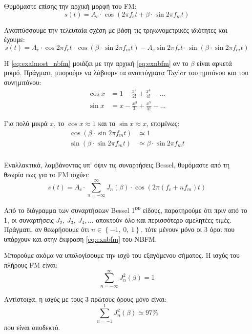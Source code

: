 \documentclass[11pt,a4paper,notitlepage,fleqn]{article}
\begin{document}
Θυμόμαστε επίσης την αρχική μορφή του FM:
\[
s(t) = A_c \cdot \cos\left(2πf_c t + β\cdot \sin 2πf_m t\right)
\]

Αναπτύσσουμε την τελευταία σχέση με βάση τις τριγωνομετρικές ιδιότητες και έχουμε:
\begin{equation}
	s(t) = A_c \cdot \cos 2πf_c t \cdot \cos \left(
	β\cdot \sin2π f_m t
	\right) - A_c \sin 2πf_c t \cdot \sin(β\cdot \sin 2πf_m t)
	\label{eq:exalmost_nbfm}
\end{equation}

Η \eqref{eq:exalmost_nbfm} μοιάζει με την αρχική \eqref{eq:exnbfm} αν το \( β \) είναι
αρκετά μικρό. Πράγματι, μπορούμε να λάβουμε τα αναπτύγματα Taylor του ημιτόνου και του
συνημιτόνου:
\begin{align*}
	\cos x &= 1 - \frac{x^2}{2!} + \frac{x^4}{4!} - \dots \\
	\sin x &= x - \frac{x^3}{3!} + \frac{x^5}{5!} - \dots
\end{align*}

Για πολύ μικρά \( x \), το \( \cos x \approx 1 \) και το \( \sin x \approx x \), επομένως:
\begin{align*}
	\cos(β\cdot\sin 2πf_m t) &\simeq 1 \\
	\sin(β\cdot \sin 2πf_m t) &\simeq β\cdot \sin 2πf_m t
\end{align*}

\subparagraph{}
Εναλλακτικά, λαμβάνοντας υπ' όψιν τις συναρτήσεις Bessel, θυμόμαστε από τη θεωρία πως για το
FM ισχύει:
\[
s(t) = A_c \cdot \sum_{n=-\infty}^{\infty} J_n(β)
\cdot \cos\left(2π\left(f_c+nf_m\right)t\right)
\]

Από το διάγραμμα των συναρτήσεων Bessel 1\textsuperscript{ου} είδους, παρατηρούμε ότι πριν
από το 1, οι συναρτήσεις \( J_2,\ J_3,\ J_4, \dots \) αποκτούν όλο και περισσότερο
αμελητέες τιμές. Πράγματι, αν θεωρήσουμε ότι \( n \in \left\lbrace -1,\ 0,\ 1 \right\rbrace \),
τότε μένουν μόνο οι 3 όροι που υπάρχουν και στην έκφραση \eqref{eq:exnbfm} του NBFM.

Μπορούμε ακόμα να υπολογίσουμε την ισχύ του εξαγόμενου σήματος. Η ισχύς του πλήρους
FM είναι:
\[
\sum_{n=-\infty}^{\infty} J_n^2(β) = 1
\]

Αντίστοιχα, η ισχύς με τους 3 πρώτους όρους μόνο είναι:
\[
\sum_{n=-1}^{1}J_n^2 (β) \simeq 97\%
\]
που είναι αποδεκτό.
\end{document}
